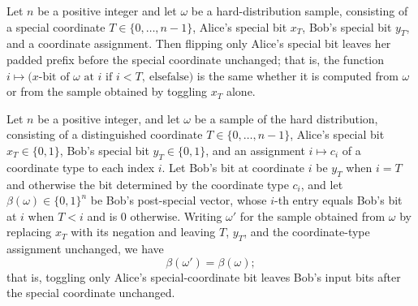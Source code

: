 \begin{theorem}
\label{CommunicationComplexity.Functions.Disjointness.RandomizedLowerBound.xBeforeSpecial_flipSpecialX}
\leanok
{}
Let $n$ be a positive integer and let $\omega$ be a hard-distribution sample, consisting
of a special coordinate $T \in \{0,\dots,n-1\}$, Alice's special bit $x_T$, Bob's
special bit $y_T$, and a coordinate assignment. Then flipping only Alice's special bit
leaves her padded prefix before the special coordinate unchanged; that is, the function
$i \mapsto \bigl(x\text{-bit of }\omega\text{ at }i\text{ if }i < T,\ \text{else
}\mathrm{false}\bigr)$ is the same whether it is computed from $\omega$ or from the
sample obtained by toggling $x_T$ alone.
\end{theorem}

\begin{theorem}
\label{CommunicationComplexity.Functions.Disjointness.RandomizedLowerBound.yAfterSpecial_flipSpecialX}
\leanok
{}
Let $n$ be a positive integer, and let $\omega$ be a sample of the hard distribution,
consisting of a distinguished coordinate $T \in \{0,\dots,n-1\}$, Alice's special bit
$x_T \in \{0,1\}$, Bob's special bit $y_T \in \{0,1\}$, and an assignment $i \mapsto
c_i$ of a coordinate type to each index $i$. Let Bob's bit at coordinate $i$ be $y_T$
when $i = T$ and otherwise the bit determined by the coordinate type $c_i$, and let
$\beta(\omega) \in \{0,1\}^n$ be Bob's post-special vector, whose $i$-th entry equals
Bob's bit at $i$ when $T < i$ and is $0$ otherwise. Writing $\omega'$ for the sample
obtained from $\omega$ by replacing $x_T$ with its negation and leaving $T$, $y_T$, and
the coordinate-type assignment unchanged, we have \[ \beta(\omega') = \beta(\omega); \]
that is, toggling only Alice's special-coordinate bit leaves Bob's input bits after the
special coordinate unchanged.
\end{theorem}

